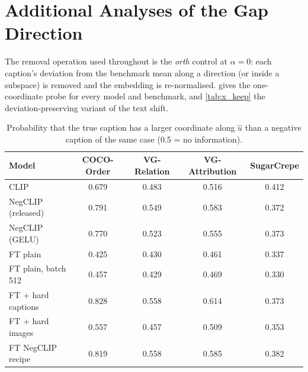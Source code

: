\documentclass{article}
\newcommand{\uhat}{\hat{u}}
\begin{document}
\section{Additional Analyses of the Gap Direction}
\label{app:extra}

The removal operation used throughout is the \emph{orth} control at $\alpha=0$: each caption's deviation from the benchmark mean along a direction (or inside a subspace) is removed and the embedding is re-normalised.  gives the one-coordinate probe for every model and benchmark, and \cref{tab:x_keep} the deviation-preserving variant of the text shift.

\begin{table}[H]
\caption{Probability that the true caption has a larger coordinate along $\uhat$ than a negative caption of the same case (0.5 = no information).}
\label{tab:x_auc}
\begin{center}
\begin{small}
\begin{tabular}{lcccc}
\toprule
Model & COCO-Order & VG-Relation & VG-Attribution & SugarCrepe \\
\midrule
CLIP & 0.679 & 0.483 & 0.516 & 0.412 \\
NegCLIP (released) & 0.791 & 0.549 & 0.583 & 0.372 \\
NegCLIP (GELU) & 0.770 & 0.523 & 0.555 & 0.373 \\
FT plain & 0.425 & 0.430 & 0.461 & 0.337 \\
FT plain, batch 512 & 0.457 & 0.429 & 0.469 & 0.330 \\
FT + hard captions & 0.828 & 0.558 & 0.614 & 0.373 \\
FT + hard images & 0.557 & 0.457 & 0.509 & 0.353 \\
FT NegCLIP recipe & 0.819 & 0.558 & 0.585 & 0.382 \\
\bottomrule
\end{tabular}
\end{small}
\end{center}
\end{table}
\end{document}
